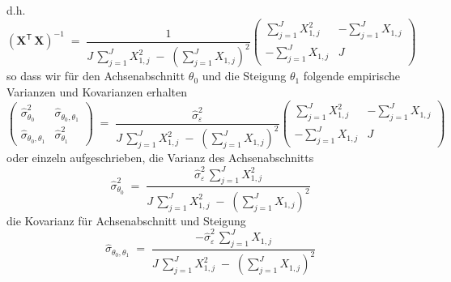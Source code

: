 d.h.
\begin{equation}
\left( \mathbf{X}^\mathsf{T}  \, \mathbf{X} \right)^{-1} \; = \;
\frac{1}{J \, \sum\limits_{j=1}^J X_{1,j}^2 \; - \;
	\left(\sum\limits_{j=1}^J X_{1,j}\right)^2}
\left(
\begin{array}{ccc}
\sum\limits_{j=1}^J X_{1,j}^2 & -\sum\limits_{j=1}^J X_{1,j} \\
-\sum\limits_{j=1}^J X_{1,j} & J
\end{array}
\right)
\end{equation}
so dass wir für den Achsenabschnitt $\theta_0$ und die Steigung $\theta_1$ folgende
empirische Varianzen und Kovarianzen erhalten
\begin{equation}
\left(\begin{array}{cc}
\hat \sigma^2_{\theta_0} &\hat \sigma_{\theta_0, \theta_1}\\
\hat \sigma_{\theta_0, \theta_1} & \hat \sigma^2_{\theta_1}
\end{array}\right)
\; = \;
\frac{\hat \sigma^2_\varepsilon}{J \, \sum\limits_{j=1}^J X_{1,j}^2 \; - \;
	\left(\sum\limits_{j=1}^J X_{1,j}\right)^2}
\left(
\begin{array}{ccc}
\sum\limits_{j=1}^J X_{1,j}^2 & -\sum\limits_{j=1}^J X_{1,j} \\
-\sum\limits_{j=1}^J X_{1,j} & J
\end{array}
\right)
\end{equation}
oder einzeln aufgeschrieben, die Varianz des Achsenabschnitts
\begin{equation}
\hat \sigma^2_{\theta_0} \; = \;
\frac{\hat \sigma^2_\varepsilon \, \sum\limits_{j=1}^J X_{1,j}^2}{J \,
	\sum\limits_{j=1}^J X_{1,j}^2 \; - \; \left(\sum\limits_{j=1}^J X_{1,j}\right)^2}
\label{eq:Varianz des Achsenabschnitts}
\end{equation}
die Kovarianz für Achsenabschnitt und Steigung
\begin{equation}
\hat \sigma_{\theta_0, \theta_1} \; = \;
\frac{- \hat \sigma^2_\varepsilon \, \sum\limits_{j=1}^J X_{1,j}}{J \, \sum_{j=1}^J X_{1,j}^2 \;
	- \; \left(\sum\limits_{j=1}^J X_{1,j}\right)^2}
\end{equation}
